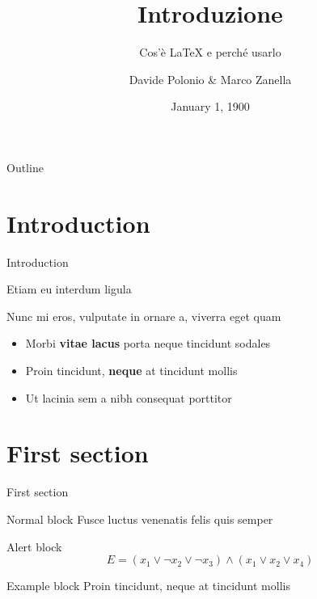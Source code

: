 \documentclass{beamer}
\title{Introduzione}
\subtitle{Cos'è \LaTeX{} e perché usarlo}
\author{Davide Polonio \& Marco Zanella}
\date{January 1, 1900}
\begin{document}
	\maketitle

	\begin{frame}{Outline}
		\tableofcontents
	\end{frame}


	\section{Introduction}

	\begin{frame}{Introduction}

		Etiam eu interdum ligula

		Nunc mi eros, vulputate in ornare a, viverra eget quam \vspace{.5em}

		\begin{itemize}
			\item Morbi \textbf{vitae lacus} porta neque tincidunt sodales \vspace{.5em}
			\item Proin tincidunt, \textbf{neque} at tincidunt mollis \vspace{.5em}
			\item Ut \alert{lacinia sem a nibh} consequat porttitor
		\end{itemize}
	\end{frame}


	\section{First section}

	\begin{frame}{First section}
		\begin{block}{Normal block}
			Fusce luctus venenatis felis quis semper
		\end{block}

		\begin{alertblock}{Alert block}
			$$ E = (x_1 \vee \neg x_2 \vee \neg x_3) \wedge (x_1 \vee x_2 \vee x_4) $$
		\end{alertblock}

		\begin{exampleblock}{Example block}
			Proin tincidunt, neque at tincidunt mollis
		\end{exampleblock}
	\end{frame}
\end{document}
